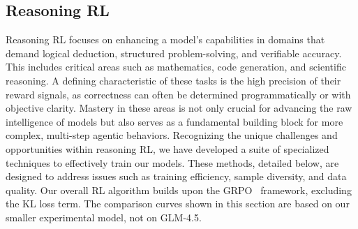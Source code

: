 


\subsection{Reasoning RL}

Reasoning RL focuses on enhancing a model's capabilities in domains that demand logical deduction, structured problem-solving, and verifiable accuracy. This includes critical areas such as mathematics, code generation, and scientific reasoning. A defining characteristic of these tasks is the high precision of their reward signals, as correctness can often be determined programmatically or with objective clarity. Mastery in these areas is not only crucial for advancing the raw intelligence of models but also serves as a fundamental building block for more complex, multi-step agentic behaviors. Recognizing the unique challenges and opportunities within reasoning RL, we have developed a suite of specialized techniques to effectively train our models. These methods, detailed below, are designed to address issues such as training efficiency, sample diversity, and data quality. Our overall RL algorithm builds upon the GRPO~\cite{shao2024deepseekmath} framework, excluding the KL loss term. The comparison curves shown in this section are based on our smaller experimental model, not on GLM-4.5.


